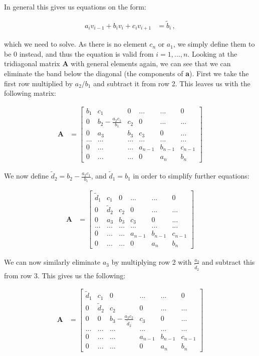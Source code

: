 \documentclass[english,notitlepage,reprint,nofootinbib]{revtex4-1}  %
\begin{document}
In general this gives us equations on the form:

\begin{align*}
a_i v_{i-1} + b_i v_i + c_i v_{i+1} &= \tilde{b}_i \, ,
\end{align*}

which we need to solve. As there is no element $c_n$ or $a_1$, we simply define them to be 0 instead, and thus the equation is valid from $i = 1,...,n$. Looking at the tridiagonal matrix \textbf{A} with general elements again, we can see that we can eliminate the band below the diagonal (the components of \textbf{a}). First we take the first row multiplied by $a_2/b_1$ and subtract it from row 2. This leaves us with the following matrix:

\begin{align*}
\textbf{A} &= \begin{bmatrix}
b_1 & c_1 & 0 & ... & ... & 0 \\
0 & b_2 - \frac{a_2c_1}{b_1} & c_2 & 0 & ... & ... \\
0 & a_3 & b_3 & c_3 & 0 & ... \\
... & ... & ... & ... & ... & ... \\
0 & ... & ... & a_{n-1} & b_{n-1} & c_{n-1} \\
0 & ... & ... & 0 & a_{n} & b_n
\end{bmatrix}
\end{align*}

We now define $\tilde{d}_2 = b_2 - \frac{a_2c_1}{b_1}$, and $\tilde{d}_1 = b_1$ in order to simplify further equations:

\begin{align*}
\textbf{A} &= \begin{bmatrix}
\tilde{d}_1 & c_1 & 0 & ... & ... & 0 \\
0 & \tilde{d}_2 & c_2 & 0 & ... & ... \\
0 & a_3 & b_3 & c_3 & 0 & ... \\
... & ... & ... & ... & ... & ... \\
0 & ... & ... & a_{n-1} & b_{n-1} & c_{n-1} \\
0 & ... & ... & 0 & a_{n} & b_n
\end{bmatrix}
\end{align*}

We can now similarly eliminate $a_3$ by multiplying row 2 with $\frac{a_3}{\tilde{d}_2}$ and subtract this from row 3. This gives us the following:

\begin{align*}
\textbf{A} &= \begin{bmatrix}
\tilde{d}_1 & c_1 & 0 & ... & ... & 0 \\
0 & \tilde{d}_2 & c_2 & 0 & ... & ... \\
0 & 0 & b_3 - \frac{a_3 c_2}{\tilde{d}_2} & c_3 & 0 & ... \\
... & ... & ... & ... & ... & ... \\
0 & ... & ... & a_{n-1} & b_{n-1} & c_{n-1} \\
0 & ... & ... & 0 & a_{n} & b_n
\end{bmatrix}
\end{align*}
\end{document}
